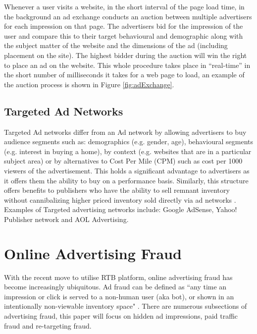 \documentclass[12pt]{article}
\begin{document}
Whenever a user visits a website, in the short interval of the page load time, in the background an ad exchange conducts an auction between multiple advertisers for each impression on that page. The advertisers bid for the impression of the user and compare this to their target behavioural and demographic along with the subject matter of the website and the dimensions of the ad (including placement on the site). The highest bidder during the auction will win the right to place an ad on the website. This whole procedure takes place in ``real-time'' in the short number of milliseconds it takes for a web page to load, an example of the auction process is shown in Figure \ref{fig:adExchange}. 

\subsection{Targeted Ad Networks}
Targeted Ad networks differ from an Ad network by allowing advertisers to buy audience segments such as: demographics (e.g. gender, age),  behavioural segments (e.g. interest in buying a home), by context (e.g. websites that are in a particular subject area) or by alternatives to Cost Per Mile (CPM) such as cost per 1000 viewers of the advertisement. This holds a significant advantage to advertisers as it offers them the ability to buy on a performance basis. Similarly, this structure offers benefits to publishers who have the ability to sell remnant inventory without cannibalizing higher priced inventory sold directly via ad networks \parencite{adExchanges}. Examples of Targeted advertising networks include: Google AdSense, Yahoo! Publisher network and AOL Advertising. 

\section{Online Advertising Fraud}
With the recent move to utilise RTB platform, online advertising fraud has become increasingly ubiquitous. Ad fraud can be defined as ``any time an impression or click is served to a non-human user (aka bot), or shown in an intentionally non-viewable inventory space" \parencite{dstillery}. There are numerous subsections of advertising fraud, this paper will focus on hidden ad impressions, paid traffic fraud and re-targeting fraud.   

\end{document}
